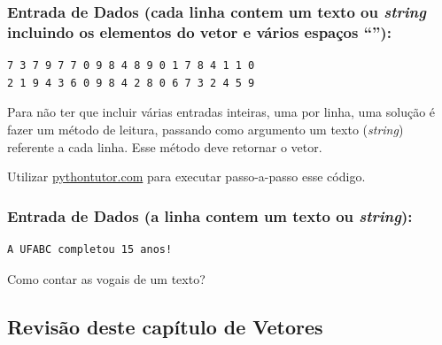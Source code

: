 \documentclass[12pt,a4paper]{article}
\begin{document}
\hypertarget{entrada-de-dados-cada-linha-contem-um-texto-ou-string-incluindo-os-elementos-do-vetor-e-vuxe1rios-espauxe7os}{%
\subsubsection{\texorpdfstring{Entrada de Dados (cada linha contem um
texto ou \emph{string} incluindo os elementos do vetor e vários espaços
``\texttt{}''):}{Entrada de Dados (cada linha contem um texto ou string incluindo os elementos do vetor e vários espaços ``''):}}\label{entrada-de-dados-cada-linha-contem-um-texto-ou-string-incluindo-os-elementos-do-vetor-e-vuxe1rios-espauxe7os}}

\begin{verbatim}
7 3 7 9 7 7 0 9 8 4 8 9 0 1 7 8 4 1 1 0
2 1 9 4 3 6 0 9 8 4 2 8 0 6 7 3 2 4 5 9
\end{verbatim}

Para não ter que incluir várias entradas inteiras, uma por linha, uma
solução é fazer um método de leitura, passando como argumento um texto
(\emph{string}) referente a cada linha. Esse método deve retornar o
vetor.

    Utilizar \href{https://pythontutor.com/}{pythontutor.com} para executar
passo-a-passo esse código.

    \hypertarget{entrada-de-dados-a-linha-contem-um-texto-ou-string}{%
\subsubsection{\texorpdfstring{Entrada de Dados (a linha contem um texto
ou
\emph{string}):}{Entrada de Dados (a linha contem um texto ou string):}}\label{entrada-de-dados-a-linha-contem-um-texto-ou-string}}

\begin{verbatim}
A UFABC completou 15 anos!
\end{verbatim}

Como contar as vogais de um texto?

    \hypertarget{revisuxe3o-deste-capuxedtulo-de-vetores}{%
\subsection{Revisão deste capítulo de
Vetores}\label{revisuxe3o-deste-capuxedtulo-de-vetores}}
\end{document}

